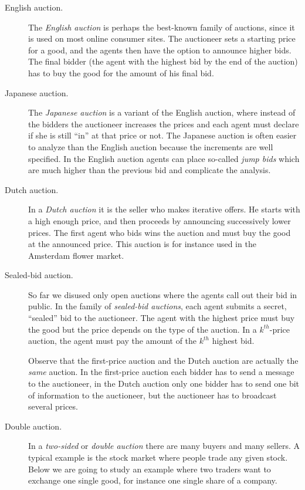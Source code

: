 \begin{description}
\item[English auction.]
The \emph{English auction} is perhaps the best-known family of auctions, since it is used on most online consumer sites. The auctioneer sets a starting price for a good, and the agents then have the option to announce higher bids. The final bidder (the agent with the highest bid by the end of the auction) has to buy the good for the amount of his final bid.

\item[Japanese auction.]
The \emph{Japanese auction} is a variant of the English auction, where instead of the bidders the auctioneer increases the prices and each agent must declare if she is still ``in'' at that price or not. The Japanese auction is often easier to analyze than the English auction because the increments are well specified. In the English auction agents can place so-called \emph{jump bids} which are much higher than the previous bid and complicate the analysis.

\item[Dutch auction.]
In a \emph{Dutch auction} it is the seller who makes iterative offers. He starts with a high enough price, and then proceeds by announcing successively lower prices. The first agent who bids wins the auction and must buy the good at the announced price. This auction is for instance used in the Amsterdam flower market.

\item[Sealed-bid auction.]
So far we disused only open auctions where the agents call out their bid in public. In the family of \emph{sealed-bid auctions}, each agent submits a secret, ``sealed'' bid to the auctioneer. The agent with the highest price must buy the good but the price depends on the type of the auction. In a $k^{th}$-price auction, the agent must  pay the amount of the  $k^{th}$ highest bid.

Observe that the first-price auction and the Dutch auction are actually the \emph{same} auction. In the first-price auction each bidder has to send a message to the auctioneer, in the Dutch auction only one bidder has to send one bit of information to the auctioneer, but the auctioneer has to broadcast several prices.

\item[Double auction.]
In a \emph{two-sided} or \emph{double auction} there are many buyers and many sellers. A typical example is the stock market where people trade any given stock. Below we are going to study an example where two traders want to exchange one single good, for instance one single share of a company.

\end{description}

